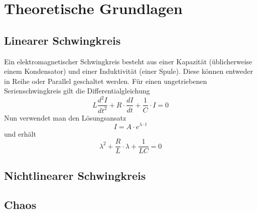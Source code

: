 \section{Theoretische Grundlagen}

\subsection{Linearer Schwingkreis}
Ein elektromagnetischer Schwingkreis besteht aus einer Kapazität (üblicherweise einem Kondensator) und einer Induktivität (einer Spule). Diese können entweder in Reihe oder Parallel geschaltet werden. Für einen ungetriebenen Serienschwingkreis gilt die Differentialgleichung
\begin{equation}
 L \frac{d^2 I}{d t^2} + R \cdot \frac{d I}{d t} + \frac{1}{C} \cdot I = 0
\end{equation}
Nun verwendet man den Lösungsansatz
\begin{equation}
 I = A \cdot e^{\lambda \cdot t}
\end{equation}
und erhält
\begin{equation}
 \lambda^2 + \frac{R}{L} \cdot \lambda + \frac{1}{LC} = 0
\end{equation}





\subsection{Nichtlinearer Schwingkreis}

\subsection{Chaos}